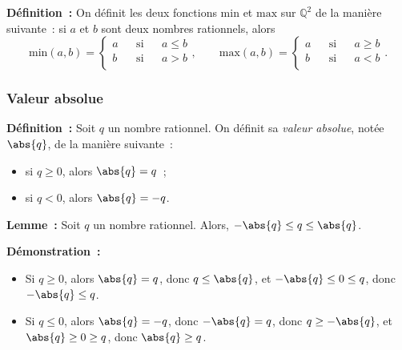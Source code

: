    \done

\medskip

\noindent\textbf{Définition :} On définit les deux fonctions $\mathrm{min}$ et $\mathrm{max}$ sur $\mathbb{Q}^2$ de la manière suivante : si $a$ et $b$ sont deux nombres rationnels, alors 
\begin{equation*}
    \mathrm{min}(a,b) = \left\lbrace \begin{aligned}
        a & & \text{si} & & a \leq b \\
        b & & \text{si} & & a > b \\
    \end{aligned} \right. 
    , \qquad
    \mathrm{max}(a,b) = \left\lbrace \begin{aligned}
        a & & \text{si} & & a \geq b \\
        b & & \text{si} & & a < b \\
    \end{aligned} \right. 
    .
\end{equation*}

\subsubsection{Valeur absolue}

\noindent\textbf{Définition :}  \sindex[isy]{$\abs{\cdot}$}
    Soit $q$ un nombre rationnel. 
    On définit sa \emph{valeur absolue}, notée $\abs{q}$, de la manière suivante : 
    \begin{itemize}[nosep]
        \item si $q \geq 0$, alors $\abs{q} = q$ ; 
        \item si $q < 0$, alors $\abs{q} = -q$.
    \end{itemize}

\medskip

\noindent\textbf{Lemme :} Soit $q$ un nombre rationnel.
    Alors, $- \abs{q} \leq q \leq \abs{q}$.

\medskip

\noindent\textbf{Démonstration :} 
    \begin{itemize}
        \item Si $q \geq 0$, alors $\abs{q} = q$, donc $q \leq \abs{q}$, et $-\abs{q} \leq 0 \leq q$, donc $- \abs{q} \leq q$.
        \item Si $q \leq 0$, alors $\abs{q} = -q$, donc $-\abs{q} = q$, donc $q \geq -\abs{q}$, et $\abs{q} \geq 0 \geq q$, donc $\abs{q} \geq q$.
    \end{itemize}

